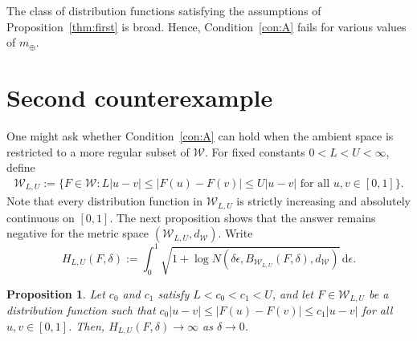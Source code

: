 \documentclass[11pt]{article}
\numberwithin{equation}{section}
\newtheorem{proposition}{Proposition}[section]
\newcommand{\W}{\mathcal{W}}
\begin{document}
The class of distribution functions satisfying the assumptions of
Proposition~\ref{thm:first} is broad. Hence, Condition~\ref{con:A} fails for
various values of \(m_\oplus\).

\section{Second counterexample}\label{sec:second}

One might ask whether Condition~\ref{con:A} can hold when the ambient space
is restricted to a more regular subset of \(\W\). For fixed constants \(0<L<U<\infty\), define
\begin{align*}
    \mathcal{W}_{L, U} := \{ F \in \W : L |u-v| \leq \left| F(u) - F(v) \right| \leq U |u-v| \text{~for all~}u, v \in [0, 1] \}.
\end{align*}
Note that every distribution function in $\mathcal{W}_{L, U}$ is strictly increasing and absolutely continuous on $[0, 1]$. The next proposition shows that the answer remains negative for the metric space \((\W_{L,U}, d_\W)\). Write
\[
H_{L, U}(F,\delta):=\int_{0}^{1} \sqrt{1+\log N(\delta \epsilon, B_{\mathcal{W}_{L, U}}(F, \delta), d_{\mathcal{W}})} \, \mathrm{d} \epsilon.
\]

\begin{proposition} \label{thm:second}
    Let \(c_0\) and \(c_1\) satisfy \(L<c_0<c_1<U\), and let
\(F\in\W_{L,U}\) be a distribution function such that $c_0|u-v|\le |F(u)-F(v)|\le c_1|u-v|$ for all $u,v\in[0,1]$. Then, $H_{L, U}(F,\delta) \to \infty$ as $\delta \to 0$.
\end{proposition}
\end{document}
